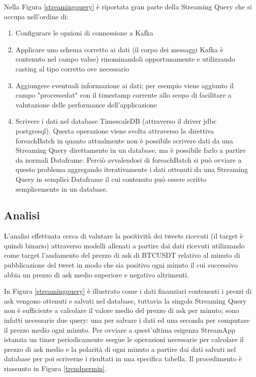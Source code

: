 Nella Figura \ref{streamingquery} è riportata gran parte della Streaming Query che si occupa
nell'ordine di:
\begin{enumerate}
    \item Configurare le opzioni di connessione a Kafka
    \item Applicare uno schema corretto ai dati (il corpo dei messaggi Kafka è contenuto nel campo
    value) rinominandoli opportunamente e utilizzando casting al tipo corretto ove necessario
    \item Aggiungere eventuali informazione ai dati; per esempio viene aggiunto il campo
    "processedat" con il timestamp corrente allo scopo di facilitare a valutazione delle performance
    dell'applicazione
    \item Scrivere i dati nel database TimescaleDB (attraverso il driver jdbc postgresql). Questa
    operazione viene svolta attraverso la direttiva foreachBatch in quanto attualmente non è
    possibile scrivere dati da una Streaming Query direttamente in un database, ma è possibile farlo a
    partire da normali Dataframe. Perciò avvalendosi di foreachBatch si può ovviare a questo
    problema aggregando iterativamente i dati ottenuti da una Streaming Query in semplici Dataframe
    il cui contenuto può essere scritto semplicemente in un database.

\end{enumerate}

\subsection{Analisi}

L'analisi effettuata cerca di valutare la positività dei tweets ricevuti (il target è quindi
binario) attraverso modelli allenati a partire dai dati ricevuti utilizzando come target
l'andamento del prezzo di ask di BTCUSDT relativo al minuto di pubblicazione del tweet in modo
che sia positivo ogni minuto il cui successivo abbia un prezzo di ask medio superiore e
negativo altrimenti.

In Figura \ref{streamingquery} è illustrato come i dati finanziari contenenti i prezzi di ask
vengono ottenuti e salvati nel database, tuttavia la singola Streaming Query non è sufficiente
a calcolare il valore medio del prezzo di ask per minuto; sono infatti necessarie due query: una
per salvare i dati ed una seconda per computare il prezzo medio ogni minuto. Per ovviare a
quest'ultima esigenza StreamApp istanzia un timer periodicamente esegue le operazioni necessarie
per calcolare il prezzo di ask medio e la polarità di ogni minuto a partire dai
dati salvati nel database per poi scriverne i risultati in una specifica tabella. Il procedimento
è riassunto in Figura \ref{trendpermin}.

